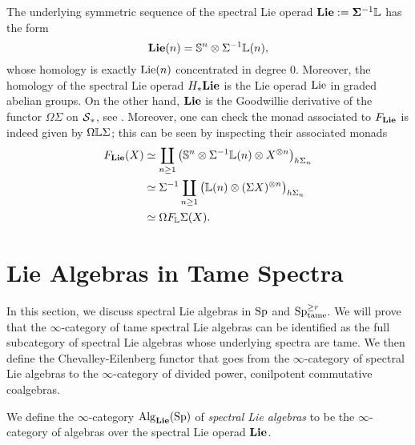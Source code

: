 \begin{remark}
\label{Remark on shifted Lie operads}
The underlying symmetric sequence of the spectral Lie operad $\mathbf{Lie}:= \mathbf{\Sigma}^{-1}{\mathbb{L}}$
	has the form 	
	$$
	\mathbf{Lie}(n)= {\mathbb{S}}^{n} \otimes \Sigma^{-1} {\mathbb{L}}(n),
	$$
	whose homology is exactly $\operatorname{Lie}(n)$ concentrated in degree $0$.
	Moreover, the homology of the spectral Lie operad $H_{*}\mathbf{Lie}$ is the Lie operad $\operatorname{Lie}$ in graded abelian groups.
	On the other hand, $\mathbf{Lie}$ is the Goodwillie derivative of the functor $\Omega\Sigma$ on $\operatorname{\mathcal{S}}_*$, see \cite[Section 8]{GoodwillieIII}.
	Moreover, one can check the monad associated to $F_{\mathbf{Lie}}$ is indeed given by $\Omega{\mathbb{L}} \Sigma$; this can be seen by inspecting their associated monads
	\begin{align*}
		F_{\mathbf{Lie}}(X) &\simeq \coprod_{n\geq 1}
		\big(
		{\mathbb{S}}^{n} \otimes \Sigma^{-1}{\mathbb{L}}(n) 
		\otimes X^{\otimes n}
		\big)_{h\Sigma_n}\\
		& \simeq 
		\Sigma^{-1}
		\coprod_{n\geq 1}
		\big(
		{\mathbb{L}}(n) 
		\otimes (\Sigma X)^{\otimes n}
		\big)_{h\Sigma_n}\\
		& \simeq 
		\Omega F_{{\mathbb{L}}}\Sigma(X).
	\end{align*}	
\end{remark}






\section{Lie Algebras in Tame Spectra}
\label{Lie Algebras in Tame Spectra}
In this section, we discuss spectral Lie algebras in $\operatorname{Sp}$ and $\operatorname{Sp}^{\geq r}_{\operatorname{tame}}$. We will prove that the $\infty$-category of tame spectral Lie algebras can be identified as the full subcategory of spectral Lie algebras whose underlying spectra are tame.
We then define the Chevalley-Eilenberg functor that goes from the $\infty$-category of spectral Lie algebras to the $\infty$-category of divided power, conilpotent commutative coalgebras.


\begin{definition}
\label{Spectral Lie operad}
We define the $\infty$-category $\operatorname{Alg}_{\mathbf{Lie}}(\operatorname{Sp})$ of \emph{spectral Lie algebras} to be the $\infty$-category of algebras over the spectral Lie operad $\mathbf{Lie}$.
\end{definition}

